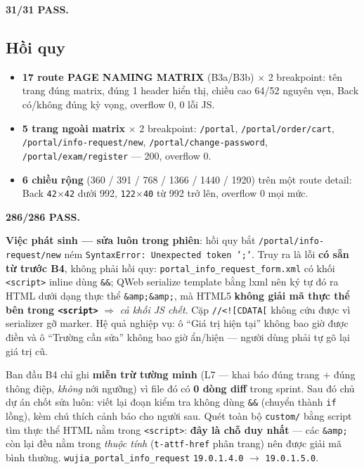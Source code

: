 \textbf{31/31 PASS.}

\subsection{Hồi quy}

\begin{itemize}
\item \textbf{17 route PAGE NAMING MATRIX} (B3a/B3b) $\times$ 2 breakpoint: tên trang đúng
  matrix, đúng 1 header hiển thị, chiều cao 64/52 nguyên vẹn, Back có/không đúng kỳ vọng,
  overflow 0, 0 lỗi JS.
\item \textbf{5 trang ngoài matrix} $\times$ 2 breakpoint: \texttt{/portal},
  \texttt{/portal/order/cart}, \texttt{/portal/info-request/new},
  \texttt{/portal/change-password}, \texttt{/portal/exam/register} --- 200, overflow 0.
\item \textbf{6 chiều rộng} (360 / 391 / 768 / 1366 / 1440 / 1920) trên một route detail: Back
  \texttt{42$\times$42} dưới 992, \texttt{122$\times$40} từ 992 trở lên, overflow 0 mọi mức.
\end{itemize}

\textbf{286/286 PASS.}

\textbf{Việc phát sinh --- sửa luôn trong phiên}: hồi quy bắt
\texttt{/portal/info-request/new} ném \texttt{SyntaxError: Unexpected token ';'}. Truy ra là
lỗi \textbf{có sẵn từ trước B4}, không phải hồi quy: \texttt{portal\_info\_request\_form.xml}
có khối \texttt{<script>} inline dùng \texttt{\&\&}; QWeb serialize template bằng lxml nên ký
tự đó ra HTML dưới dạng thực thể \texttt{\&amp;\&amp;}, mà HTML5 \textbf{không giải mã thực
thể bên trong \texttt{<script>}} $\Rightarrow$ \emph{cả khối JS chết}. Cặp
\texttt{//<![CDATA[} không cứu được vì serializer gỡ marker. Hệ quả nghiệp vụ: ô ``Giá trị
hiện tại'' không bao giờ được điền và ô ``Trường cần sửa'' không bao giờ ẩn/hiện --- người
dùng phải tự gõ lại giá trị cũ.

Ban đầu B4 chỉ ghi \textbf{miễn trừ tường minh} (L7 --- khai báo đúng trang $+$ đúng thông
điệp, \emph{không} nới ngưỡng) vì file đó có \textbf{0 dòng diff} trong sprint. Sau đó chủ dự
án chốt sửa luôn: viết lại đoạn kiểm tra không dùng \texttt{\&\&} (chuyển thành \texttt{if}
lồng), kèm chú thích cảnh báo cho người sau. Quét toàn bộ \texttt{custom/} bằng script tìm
thực thể HTML nằm trong \texttt{<script>}: \textbf{đây là chỗ duy nhất} --- các
\texttt{\&amp;} còn lại đều nằm trong \emph{thuộc tính} (\texttt{t-attf-href} phân trang) nên
được giải mã bình thường. \texttt{wujia\_portal\_info\_request}
\texttt{19.0.1.4.0} $\to$ \texttt{19.0.1.5.0}.

